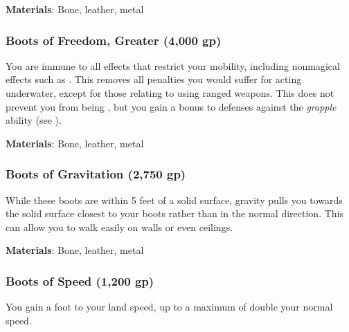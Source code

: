 \vspace{0.25em}
\textbf{Materials}: Bone, leather, metal


\lowercase{\hypertarget{item:Boots of Freedom, Greater}{}}\label{item:Boots of Freedom, Greater}
\hypertarget{item:Boots of Freedom, Greater}{\subsubsection{Boots of Freedom, Greater\hfill{} (4,000 gp)}}

You are immune to all effects that restrict your mobility, including nonmagical effects such as .
This removes all penalties you would suffer for acting underwater, except for those relating to using ranged weapons.
This does not prevent you from being \grappled, but you gain a  bonus to defenses against the \textit{grapple} ability (see ).



\vspace{0.25em}
\textbf{Materials}: Bone, leather, metal


\lowercase{\hypertarget{item:Boots of Gravitation}{}}\label{item:Boots of Gravitation}
\hypertarget{item:Boots of Gravitation}{\subsubsection{Boots of Gravitation\hfill{} (2,750 gp)}}

While these boots are within 5 feet of a solid surface, gravity pulls you towards the solid surface closest to your boots rather than in the normal direction.
This can allow you to walk easily on walls or even ceilings.



\vspace{0.25em}
\textbf{Materials}: Bone, leather, metal


\lowercase{\hypertarget{item:Boots of Speed}{}}\label{item:Boots of Speed}
\hypertarget{item:Boots of Speed}{\subsubsection{Boots of Speed\hfill{} (1,200 gp)}}

You gain a  foot  to your land speed, up to a maximum of double your normal speed.



